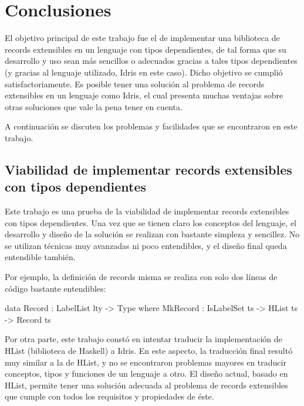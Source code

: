 
\chapter{Conclusiones}
\label{ch:5}

El objetivo principal de este trabajo fue el de implementar una biblioteca de records extensibles en un lenguaje con tipos dependientes, de tal forma que su desarrollo y uso sean más sencillos o adecuados gracias a tales tipos dependientes (y gracias al lenguaje utilizado, Idris en este caso). Dicho objetivo se cumplió satisfactoriamente. Es posible tener una solución al problema de records extensibles en un lenguaje como Idris, el cual presenta muchas ventajas sobre otras soluciones que vale la pena tener en cuenta.

A continuación se discuten los problemas y facilidades que se encontraron en este trabajo.

\section{Viabilidad de implementar records extensibles con tipos dependientes}

Este trabajo es una prueba de la viabilidad de implementar records extensibles con tipos dependientes. Una vez que se tienen claro los conceptos del lenguaje, el desarrollo y diseño de la solución se realizan con bastante simpleza y sencillez. No se utilizan técnicas muy avanzadas ni poco entendibles, y el diseño final queda entendible también.

Por ejemplo, la definición de records misma se realiza con solo dos líneas de código bastante entendibles:

\begin{code}
data Record : LabelList lty -> Type where
  MkRecord : IsLabelSet ts -> HList ts -> Record ts
\end{code}

Por otra parte, este trabajo constó en intentar traducir la implementación de HList (biblioteca de Haskell) a Idris. En este aspecto, la traducción final resultó muy similar a la de HList, y no se encontraron problemas mayores en traducir conceptos, tipos y funciones de un lenguaje a otro. El diseño actual, basado en HList, permite tener una solución adecuada al problema de records extensibles que cumple con todos los requisitos y propiedades de éste.

